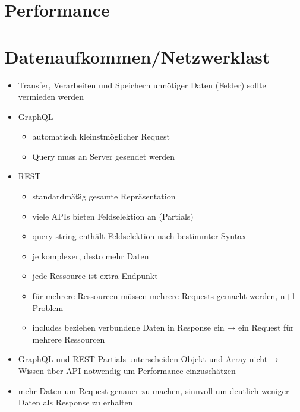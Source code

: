 \section{Performance}


\section{Datenaufkommen/Netzwerklast}
\begin{itemize}
  \item Transfer, Verarbeiten und Speichern unnötiger Daten (Felder) sollte vermieden werden
  \item GraphQL
  \begin{itemize}
    \item automatisch kleinstmöglicher Request
    \item Query muss an Server gesendet werden
  \end{itemize}
  \item REST
  \begin{itemize}
    \item standardmäßig gesamte Repräsentation
    \item viele APIs bieten Feldselektion an (Partials)
    \item query string enthält Feldselektion nach bestimmter Syntax
    \item je komplexer, desto mehr Daten
    \item jede Ressource ist extra Endpunkt
    \item für mehrere Ressourcen müssen mehrere Requests gemacht werden, n+1 Problem
    \item includes beziehen verbundene Daten in Response ein → ein Request für mehrere Ressourcen
  \end{itemize}
  \item GraphQL und REST Partials unterscheiden Objekt und Array nicht → Wissen über API notwendig um Performance einzuschätzen
  \item mehr Daten um Request genauer zu machen, sinnvoll um deutlich weniger Daten als Response zu erhalten
\end{itemize}

